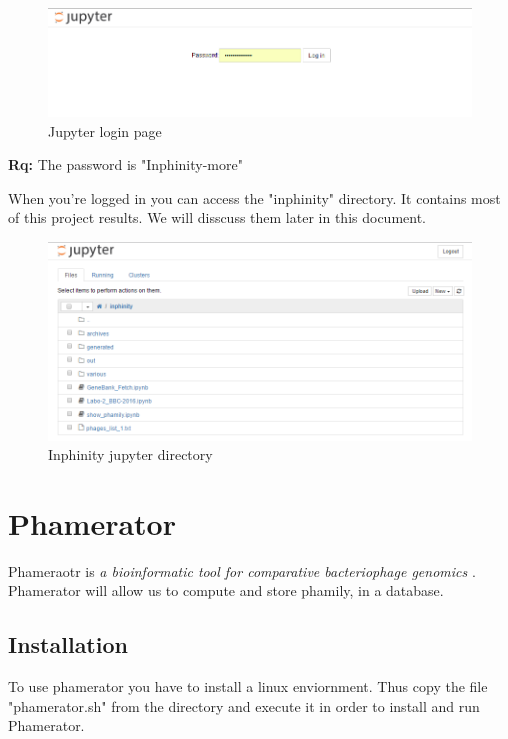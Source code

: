 \documentclass[a4paper,11pt]{report}
\begin{document}
\begin{figure}[H] 
	\begin{center}
		\includegraphics[scale=0.45]{img/login_jupyter}
		\caption{Jupyter login page}
	\end{center}
\end{figure}

\textbf{Rq:} The password is "Inphinity-more"

When you're logged in you can access the "inphinity" directory. It contains most of this project results. We will disscuss them later in this document.

\begin{figure}[H] 
	\begin{center}
		\includegraphics[scale=0.45]{img/inphinity_jupyter}
		\caption{Inphinity jupyter directory}
	\end{center}
\end{figure}

\section{Phamerator}
Phameraotr is \textit{a bioinformatic tool for comparative bacteriophage genomics} \cite{ref4}. Phamerator will allow us to compute and store phamily, in a database. 

\subsection{Installation}
To use phamerator you have to install a linux enviornment. Thus copy the file "phamerator.sh" from the directory and execute it in order to install and run Phamerator.
\end{document}
